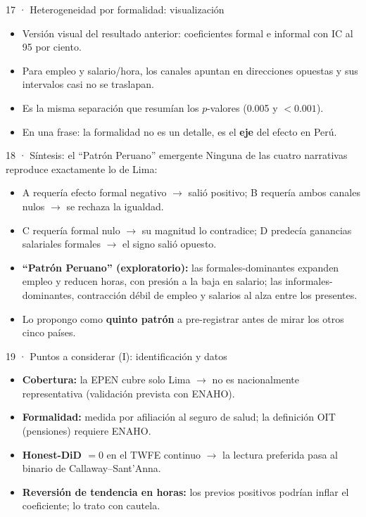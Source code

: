 \documentclass[11pt,aspectratio=169]{beamer}
\begin{document}
\begin{frame}{17 · Heterogeneidad por formalidad: visualización}
\begin{itemize}
  \item Versión visual del resultado anterior: coeficientes formal e informal con IC al 95 por ciento.
  \item Para empleo y salario/hora, los canales apuntan en direcciones opuestas y sus intervalos casi no se traslapan.
  \item Es la misma separación que resumían los $p$-valores (0.005 y $<0.001$).
  \item En una frase: la formalidad no es un detalle, es el \textbf{eje} del efecto en Perú.
\end{itemize}
\end{frame}

\begin{frame}{18 · Síntesis: el ``Patrón Peruano'' emergente}
Ninguna de las cuatro narrativas reproduce exactamente lo de Lima:
\begin{itemize}
  \item A requería efecto formal negativo $\to$ salió positivo; B requería ambos canales nulos $\to$ se rechaza la igualdad.
  \item C requería formal nulo $\to$ su magnitud lo contradice; D predecía ganancias salariales formales $\to$ el signo salió opuesto.
  \item \textbf{``Patrón Peruano'' (exploratorio):} las formales-dominantes expanden empleo y reducen horas, con presión a la baja en salario; las informales-dominantes, contracción débil de empleo y salarios al alza entre los presentes.
  \item Lo propongo como \textbf{quinto patrón} a pre-registrar antes de mirar los otros cinco países.
\end{itemize}
\end{frame}

\begin{frame}{19 · Puntos a considerar (I): identificación y datos}
\begin{itemize}
  \item \textbf{Cobertura:} la EPEN cubre solo Lima $\to$ no es nacionalmente representativa (validación prevista con ENAHO).
  \item \textbf{Formalidad:} medida por afiliación al seguro de salud; la definición OIT (pensiones) requiere ENAHO.
  \item \textbf{Honest-DiD $=0$} en el TWFE continuo $\to$ la lectura preferida pasa al binario de Callaway--Sant'Anna.
  \item \textbf{Reversión de tendencia en horas:} los previos positivos podrían inflar el coeficiente; lo trato con cautela.
\end{itemize}
\end{frame}
\end{document}
